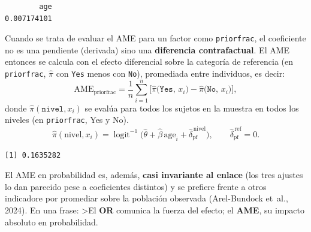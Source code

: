 \documentclass[
  letterpaper,
  DIV=11,
  numbers=noendperiod]{scrartcl}
\newenvironment{Shaded}{\begin{snugshade}}{\end{snugshade}}
\newcommand{\AttributeTok}[1]{\textcolor[rgb]{0.40,0.45,0.13}{#1}}
\newcommand{\CommentTok}[1]{\textcolor[rgb]{0.37,0.37,0.37}{#1}}
\newcommand{\FunctionTok}[1]{\textcolor[rgb]{0.28,0.35,0.67}{#1}}
\newcommand{\NormalTok}[1]{\textcolor[rgb]{0.00,0.23,0.31}{#1}}
\newcommand{\OtherTok}[1]{\textcolor[rgb]{0.00,0.23,0.31}{#1}}
\newcommand{\SpecialCharTok}[1]{\textcolor[rgb]{0.37,0.37,0.37}{#1}}
\newcommand{\StringTok}[1]{\textcolor[rgb]{0.13,0.47,0.30}{#1}}
\begin{document}
\begin{verbatim}
        age 
0.007174101 
\end{verbatim}

Cuando se trata de evaluar el AME para un factor como
\texttt{priorfrac}, el coeficiente no es una pendiente (derivada) sino
una \textbf{diferencia contrafactual}. El AME entonces se calcula con el
efecto diferencial sobre la categoría de referencia (en
\texttt{priorfrac}, \(\hat\pi\) con \texttt{Yes} menos con \texttt{No}),
promediada entre individuos, es decir: \[
\text{AME}_{\text{priorfrac}}=\frac{1}{n}\sum_{i=1}^{n}\Big[\hat\pi\big(\texttt{Yes},\,x_i\big)-\hat\pi\big(\texttt{No},\,x_i\big)\Big],
\] donde \(\hat\pi(\texttt{nivel},x_i)\) se evalúa para todos los
sujetos en la muestra en todos los niveles (en \texttt{priorfrac}, Yes y
No). \[
\hat\pi(\text{nivel},x_i)=\operatorname{logit}^{-1}\!\big(\hat\theta+\hat\beta\,\text{age}_i+\hat\delta_{\text{pf}}^{\,\text{nivel}}\big),\qquad \hat\delta_{\text{pf}}^{\,\text{ref}}=0.
\]

\begin{Shaded}
\end{Shaded}

\begin{verbatim}
[1] 0.1635282
\end{verbatim}

El AME en probabilidad es, además, \textbf{casi invariante al enlace}
(los tres ajustes lo dan parecido pese a coeficientes distintos) y se
prefiere frente a otros indicadore por promediar sobre la población
observada (Arel-Bundock et~al., 2024). En una frase: \textgreater El
\textbf{OR} comunica la fuerza del efecto; el \textbf{AME}, su impacto
absoluto en probabilidad.
\end{document}
